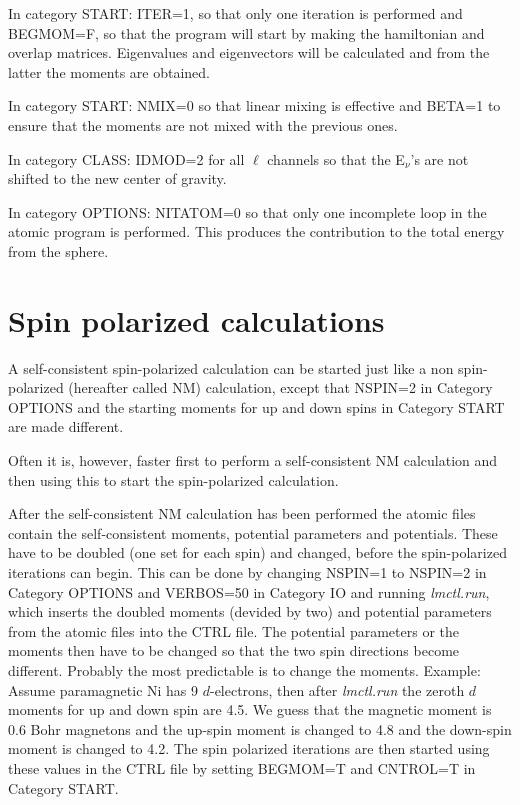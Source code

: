 \documentclass[aps,twocolumn,a4]{revtex4}
\begin{document}
In category START: ITER=1, so that only one iteration is performed
and BEGMOM=F, so that the program will start by making the hamiltonian
and overlap matrices. Eigenvalues and eigenvectors will be calculated
and from the latter the moments are obtained.

In category START: NMIX=0 so that linear mixing is effective and BETA=1
to ensure that the moments are not mixed with the previous ones.

In category CLASS: IDMOD=2 for all ${\ell }$ channels so that the
E$_{\nu }$'s are not shifted to the new center of gravity.

In category OPTIONS: NITATOM=0 so that only one incomplete loop in the
atomic program is performed. This produces the contribution to the
total energy from the sphere.


%
\section{Spin polarized calculations}
\label{spin}

A self-consistent spin-polarized calculation can be started just like a
non spin-polarized (hereafter called NM) calculation, except that
NSPIN=2 in Category OPTIONS
and the starting moments for up and down spins in Category START are
made different.

Often it is, however, faster first to perform a self-consistent NM
calculation and then using this to start the
spin-polarized calculation.

After the self-consistent NM calculation has been
performed the atomic files contain
the self-consistent moments, potential parameters and
potentials. These have to be doubled (one set for each spin)
and changed, before the spin-polarized iterations can begin.
This can be done by
changing NSPIN=1 to NSPIN=2 in Category OPTIONS and VERBOS=50
in Category IO and
running {\em lmctl.run}, which inserts the doubled moments (devided
by two) and potential parameters from the atomic files into the CTRL
file. The potential parameters or the moments then have to be changed
so that the two spin directions become different. Probably the most
predictable is to change the moments. Example: Assume paramagnetic Ni
has 9 $d$-electrons, then after {\em lmctl.run} the zeroth $d$ moments
for up and down spin are 4.5. We guess that the magnetic moment is
0.6 Bohr magnetons and the up-spin moment is changed to 4.8 and the
down-spin moment is changed to 4.2. The spin polarized iterations
are then started
using these values in the CTRL file by setting BEGMOM=T and CNTROL=T
in Category START.
\end{document}

